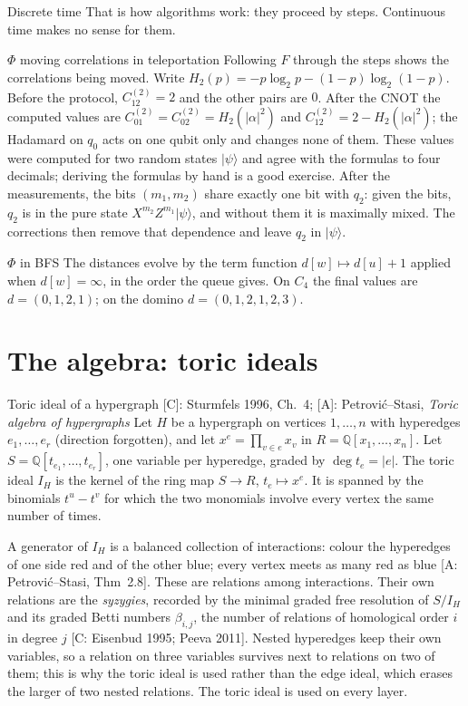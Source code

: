 \documentclass[11pt,a4paper]{article}
\providecommand{\ket}[1]{\lvert #1\rangle}
\newcommand{\Q}{\mathbb{Q}}
\newcommand{\gr}[1]{\textsf{[#1]}}
\begin{document}
\begin{why}{Discrete time}
That is how algorithms work: they proceed by steps. Continuous time makes no sense for them.
\end{why}

\begin{ex}{$\Phi$ moving correlations in teleportation}
Following $F$ through the steps shows the correlations being moved. Write $H_2(p)=-p\log_2p-(1-p)\log_2(1-p)$. Before the protocol, $C^{(2)}_{12}=2$ and the other pairs are $0$. After the CNOT the computed values are $C^{(2)}_{01}=C^{(2)}_{02}=H_2(|\alpha|^2)$ and $C^{(2)}_{12}=2-H_2(|\alpha|^2)$; the Hadamard on $q_0$ acts on one qubit only and changes none of them. These values were computed for two random states $\ket\psi$ and agree with the formulas to four decimals; deriving the formulas by hand is a good exercise. After the measurements, the bits $(m_1,m_2)$ share exactly one bit with $q_2$: given the bits, $q_2$ is in the pure state $X^{m_2}Z^{m_1}\ket\psi$, and without them it is maximally mixed. The corrections then remove that dependence and leave $q_2$ in $\ket\psi$.
\end{ex}

\begin{ex}{$\Phi$ in BFS}
The distances evolve by the term function $d[w]\mapsto d[u]+1$ applied when $d[w]=\infty$, in the order the queue gives. On $C_4$ the final values are $d=(0,1,2,1)$; on the domino $d=(0,1,2,1,2,3)$.
\end{ex}

\section{The algebra: toric ideals}\label{sec:algebra}

\begin{defn}{Toric ideal of a hypergraph \gr{C}: Sturmfels 1996, Ch.~4; \gr{A}: Petrović--Stasi, \emph{Toric algebra of hypergraphs}}
Let $H$ be a hypergraph on vertices $1,\dots,n$ with hyperedges $e_1,\dots,e_r$ (direction forgotten), and let $x^{e}=\prod_{v\in e}x_v$ in $R=\Q[x_1,\dots,x_n]$. Let $S=\Q[t_{e_1},\dots,t_{e_r}]$, one variable per hyperedge, graded by $\deg t_e=|e|$. The toric ideal $I_H$ is the kernel of the ring map $S\to R$, $t_e\mapsto x^e$. It is spanned by the binomials $t^u-t^v$ for which the two monomials involve every vertex the same number of times.
\end{defn}

A generator of $I_H$ is a balanced collection of interactions: colour the hyperedges of one side red and of the other blue; every vertex meets as many red as blue \gr{A: Petrović--Stasi, Thm~2.8}. These are relations among interactions. Their own relations are the \emph{syzygies}, recorded by the minimal graded free resolution of $S/I_H$ and its graded Betti numbers $\beta_{i,j}$, the number of relations of homological order $i$ in degree $j$ \gr{C: Eisenbud 1995; Peeva 2011}. Nested hyperedges keep their own variables, so a relation on three variables survives next to relations on two of them; this is why the toric ideal is used rather than the edge ideal, which erases the larger of two nested relations. The toric ideal is used on every layer.
\end{document}
